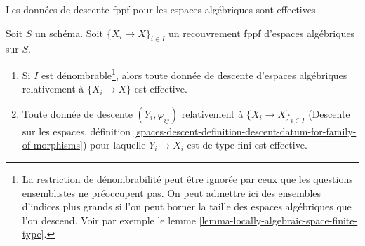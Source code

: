 \begin{lemma}
\label{lemma-descend-algebraic-space}
\begin{slogan}
Les données de descente fppf pour les espaces algébriques sont effectives.
\end{slogan}
Soit $S$ un schéma. Soit $\{X_i \to X\}_{i \in I}$ un recouvrement
fppf d'espaces algébriques sur $S$.
\begin{enumerate}
\item Si $I$ est dénombrable\footnote{La restriction de dénombrabilité peut être
ignorée par ceux que les questions ensemblistes ne préoccupent pas. On peut admettre
ici des ensembles d'indices plus grands si l'on peut borner la taille des espaces
algébriques que l'on descend. Voir par exemple le
lemme \ref{lemma-locally-algebraic-space-finite-type}.}, alors toute
donnée de descente d'espaces algébriques relativement à $\{X_i \to X\}$ est effective.
\item Toute donnée de descente $(Y_i, \varphi_{ij})$ relativement à
$\{X_i \to X\}_{i \in I}$ (Descente sur les espaces, définition
\ref{spaces-descent-definition-descent-datum-for-family-of-morphisms})
pour laquelle $Y_i \to X_i$ est de type fini
est effective.
\end{enumerate}
\end{lemma}

